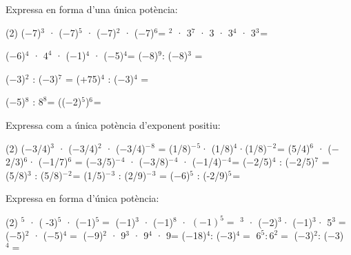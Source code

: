 \begin{mylist}
\exer \spen Expressa en forma d'una única potència:  

\begin{tasks}(2)
\task   ($-$7)${}^{3}$ · ($-$7)${}^{5}$ · ($-$7)${}^{2}$ · ($-$7)${}^{6 }$=    ${}^{2}$ · 3${}^{7}$ · 3 · 3${}^{4}$ · 3${}^{3}$${}^{ }$=

 \task   ($-$6)${}^{4}$ · ${4}^{4}$ · ($-$1)${}^{4}$ · ($-$5)${}^{4}$=   \task  ($-$8)${}^{9}$: ($-$8)${}^{3}$  =

\task   ($-$3)${}^{2}$ :  ($-$3)${}^{7}$ =    \task   (+75)${}^{4}$ : ($-$3)${}^{4}$  =  

 \task  ($-$5)${}^{8}$ : ${8}^{8}$=    \task   (($-$2)${}^{5}$)${}^{6}$${}^{ }$=
\answers{[$(-7)^{16}$, $3^{17}$, $120^4$, $8^6$, $(-3)^{-3}$, $(-25)^4$, $(-5/8)^8$, $(-2)^{30}$]}


 \end{tasks}


\exer  Expressa com a única potència d'exponent positiu:  

\begin{tasks}(2)
\task  (\textbf{$-$}3/4)${}^{3}$ · (\textbf{$-$}3/4)${}^{2}$ · (\textbf{$-$}3/4)\textbf{${}^{-}$}${}^{8}$ =  \task   (1/8)\textbf{${}^{-}$}${}^{5}$· (1/8)${}^{4}$·(1/8)${}^{-}$${}^{2}$${}^{ }$=
\task   (5/4)${}^{6}$ · (\textbf{$-$}2/3)${}^{6}$· (\textbf{$-$}1/7)${}^{6}$ =  \task   (\textbf{$-$}3/5)${}^{-}$${}^{4}$ · (\textbf{$-$}3/8)${}^{-}$${}^{4}$ · (\textbf{$-$}1/4)\textbf{${}^{-}$}${}^{4}$${}^{ }$=
 \task   ($-$2/5)${}^{4}$ : ($-$2/5)${}^{7}$ =   \task    (5/8)${}^{3}$ : (5/8)${}^{-}$${}^{2}$${}^{ }$=
 \task    (1/5)${}^{-}$${}^{3}$ : (2/9)${}^{-}$${}^{3}$ =    \task    ($-$6)${}^{5}$ : (-2/9)${}^{5}$${}^{ }$=
\end{tasks}
 \answers{[$\left(-\frac{4}{3} \right)^{2}$, $\left(\frac{1}{8} \right)^{-3}=8^3$, $\left(\frac{5}{42} \right)^6$, $\left(\frac{160}{9} \right)^4$, $\left(-\frac{5}{2} \right)^3$, $\left(\frac{5}{8} \right)^5$, $\left(\frac{10}{9} \right)^3$, $27^5$]}


\exer Expressa en forma d'única potència:
\begin{tasks}(2)
${}^{5 }$ · ( -3)${}^{5}$ · ($-$1)${}^{5 }=$    \task ($-$1)${}^{3}$ · ($-$1)${}^{8}$ · ${(-1)}^{5}=$ 
${}^{3}$ · ($-$2)${}^{3}$· ($-$1)${}^{3 }$· 5${}^{3}=$    \task ($-$5)${}^{2}$ · ($-$5)${}^{4}=$  
\task ($-$9)${}^{2}$ · 9${}^{3}$ · 9${}^{4}$ · 9=     \task ($-$18)${}^{4}$: ($-$3)${}^{4}=$   
\task ${6}^{5} : {6}^{2}=$     \task ($-$3)${}^{2}$: ($-$3)${}^{4}=$
\end{tasks}
\answers{[$6^5$, $1$, $40^3$, $5^6$, $9^{10}$, $6^4$, $6^3$, $(-3)^{-2}$]} 



\end{mylist}

